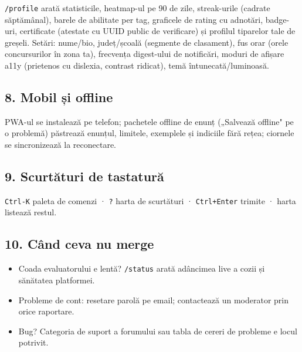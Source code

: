\documentclass[
]{article}
\providecommand{\tightlist}{%
  \setlength{\itemsep}{0pt}\setlength{\parskip}{0pt}}
\begin{document}
\texttt{/profile} arată statisticile, heatmap-ul pe 90 de zile,
streak-urile (cadrate săptămânal), barele de abilitate per tag,
graficele de rating cu adnotări, badge-uri, certificate (atestate cu
UUID public de verificare) și profilul tiparelor tale de greșeli.
Setări: nume/bio, județ/școală (segmente de clasament), fus orar (orele
concursurilor în zona ta), frecvența digest-ului de notificări, moduri
de afișare a11y (prietenos cu dislexia, contrast ridicat), temă
întunecată/luminoasă.

\subsection{8. Mobil și offline}\label{8-mobil-ux219i-offline}

PWA-ul se instalează pe telefon; pachetele offline de enunț („Salvează
offline" pe o problemă) păstrează enunțul, limitele, exemplele și
indiciile fără rețea; ciornele se sincronizează la reconectare.

\subsection{9. Scurtături de
tastatură}\label{9-scurtux103turi-de-tastaturux103}

\texttt{Ctrl-K} paleta de comenzi · \texttt{?} harta de scurtături ·
\texttt{Ctrl+Enter} trimite · harta listează restul.

\subsection{10. Când ceva nu merge}\label{10-cuxe2nd-ceva-nu-merge}

\begin{itemize}
\tightlist
\item
  Coada evaluatorului e lentă? \texttt{/status} arată adâncimea live a
  cozii și sănătatea platformei.
\item
  Probleme de cont: resetare parolă pe email; contactează un moderator
  prin orice raportare.
\item
  Bug? Categoria de suport a forumului sau tabla de cereri de probleme e
  locul potrivit.
\end{itemize}
\end{document}
